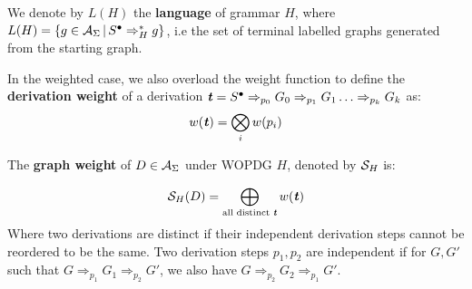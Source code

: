 \documentclass[11pt]{article}
\begin{document}
We denote by $L(H)$ the \textbf{language} of grammar $H$, where $L(H) = \{g \in
\calA_\Sigma \, | \, S^\bullet \Rightarrow_H^* g \}$, i.e the set of terminal
labelled graphs generated from the starting graph.

In the weighted case, we also overload the weight function to define the
\textbf{derivation weight} of a derivation $\tt = S^\bullet \Rightarrow_{p_0}
G_0 \Rightarrow_{p_1} G_1 \ldots \Rightarrow_{p_k} G_k$ as:
\[
    w(\tt) = \bigotimes_i w(p_i)
\]

The \textbf{graph weight} of $D \in \calA_\Sigma$ under WOPDG $H$, denoted by
$\calS_H$ is:

\[
    \calS_H(D) = \bigoplus_{\text{all distinct $\tt$}} w(\tt)
\]
Where two derivations are distinct if their independent derivation steps cannot
be reordered to be the same. Two derivation steps $p_1,p_2$ are independent if
for $G, G'$ such that $G \Rightarrow_{p_1} G_1 \Rightarrow_{p_2} G'$, we also
have $G \Rightarrow_{p_2} G_2 \Rightarrow_{p_1} G'$. 
\end{document}
